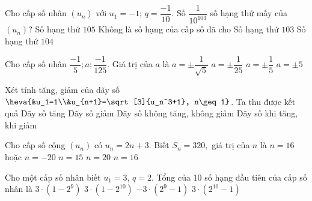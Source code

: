 \begin{ex}%
Cho cấp số nhân $( u_n )$ với $u_1=-1;\,q=\dfrac{-1}{10}$. Số $\dfrac{1}{10^{103}}$ số hạng thứ mấy của $( u_n )$?
\choice
{ Số hạng thứ $105$}
{ Không là số hạng của cấp số đã cho}
{ Số hạng thứ $103$}
{\True Số hạng thứ $104$}
\end{ex}

\begin{ex}%
Cho cấp số nhân $\dfrac{-1}{5} ; a ; \dfrac{-1}{125} .$ Giá trị của $a$ là
\choice
{$a=\pm \dfrac{1}{\sqrt{5}}$}
{\True $a=\pm \dfrac{1}{25}$}
{$a=\pm \dfrac{1}{5}$}
{$a=\pm 5$}
\end{ex}

\begin{ex}%
Xét tính tăng, giảm của dãy số  $ \heva{&u_1=1\\&u_{n+1}=\sqrt[3]{u_n^3+1}, n\geq 1} $. Ta thu được kết quả
\choice
{\True Dãy số tăng}
{Dãy số giảm}
{Dãy số không tăng, không giảm}
{Dãy số khi tăng, khi giảm}
\end{ex}

\begin{ex}%
Cho cấp số cộng $\left(u_n\right)$ có $u_n=2n+3$. Biết $S_n=320,$ giá trị của $n$ là
\choice
{$n=16$ hoặc $n=-20$}
{$n=15$}
{$n=20$}
{\True $n=16$}
\end{ex}

\begin{ex}%
Cho một cấp số nhân biết $u_1=3$, $q=2$. Tổng của 10 số hạng đầu tiên của cấp số nhân là
\choice
{$3\cdot \left( 1-2^9 \right)$}
{$3\cdot\left( 1-{2^{10}} \right)$}
{$-3\cdot\left( 2^9-1 \right)$}
{\True $3\cdot\left( {2^{10}}-1 \right)$}
\end{ex}

